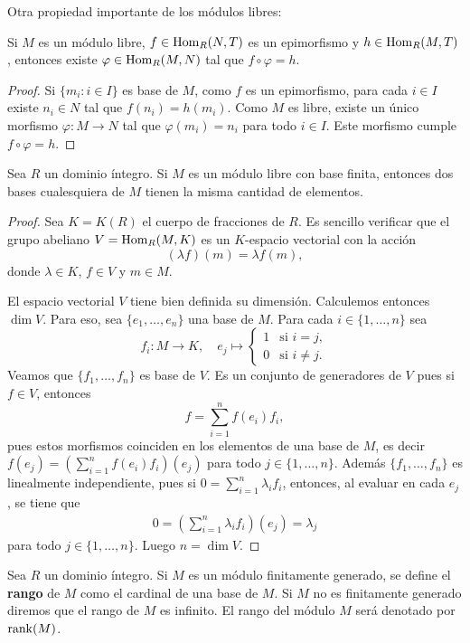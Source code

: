 Otra propiedad importante de los módulos libres:

\begin{proposition}
	Si $M$ es un módulo libre, $f\in\operatorname{Hom}_R(N,T)$ es un epimorfismo y $h\in\operatorname{Hom}_R(M,T)$, entonces existe
	$\varphi\in\operatorname{Hom}_R(M,N)$ tal que $f\circ \varphi=h$. 
\end{proposition}

\begin{proof}
Si $\{m_i:i\in I\}$ es base de $M$, como $f$ es un epimorfismo, para cada $i\in I$ existe $n_i\in N$ tal que $f(n_i)=h(m_i)$. Como 
$M$ es libre, existe un único morfismo $\varphi\colon M\to N$ tal que $\varphi(m_i)=n_i$ para todo $i\in I$. Este morfismo
cumple $f\circ \varphi=h$. 
\end{proof}



\begin{theorem}
Sea $R$ un dominio íntegro. 
Si $M$ es un módulo libre con base finita, entonces dos bases cualesquiera de $M$ 
tienen la misma cantidad de elementos.
\end{theorem}

\begin{proof}
Sea $K=K(R)$ el cuerpo de fracciones de $R$. Es sencillo verificar que el grupo abeliano  
$V=\operatorname{Hom}_R(M,K)$ es un $K$-espacio vectorial con la acción 
\[
(\lambda f)(m)=\lambda f(m),
\]
donde $\lambda\in K$, $f\in V$ y $m\in M$.

El espacio vectorial $V$ tiene bien definida su dimensión. 
Calculemos entonces $\dim V$. Para eso, sea $\{e_1,\dots,e_n\}$ una base de $M$. 
Para cada $i\in\{1,\dots,n\}$ sea
\[
f_i\colon M\to K,\quad
e_j\mapsto\begin{cases}
1 & \text{si $i=j$},\\
0 & \text{si $i\ne j$}.
\end{cases}
\]
Veamos que $\{f_1,\dots,f_n\}$ es base de $V$. Es un conjunto de generadores de $V$ pues 
si $f\in V$, entonces
\[
f=\sum_{i=1}^n f(e_i)f_i,
\]
pues estos morfismos coinciden en los elementos de una base de $M$, es decir 
$f(e_j)=(\sum_{i=1}^n f(e_i)f_i)(e_j)$ para todo $j\in\{1,\dots,n\}$.    
Además $\{f_1,\dots,f_n\}$ es linealmente independiente, pues si $0=\sum_{i=1}^n\lambda_if_i$, 
entonces, al evaluar en cada $e_j$, se tiene que 
\begin{align*}
0=\left(\sum_{i=1}^n \lambda_if_i\right)(e_j)=\lambda_j
\end{align*}
para todo $j\in\{1,\dots,n\}$. Luego $n=\dim V$. 
\end{proof}

\begin{definition}
Sea $R$ un dominio íntegro. Si $M$ es un módulo finitamente generado, se 
define el \textbf{rango} de $M$ como el cardinal de una base de $M$. Si $M$ no es finitamente
generado diremos que el rango de $M$ es infinito. El rango del módulo $M$ será denotado por $\operatorname{rank}(M)$.   
\end{definition}